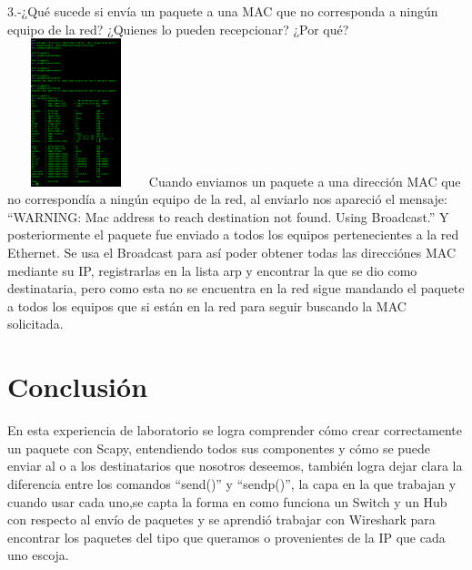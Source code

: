 \documentclass{udpreport}
\begin{document}
  	  3.-¿Qué sucede si envía un paquete a una MAC que no corresponda a ningún equipo
  	      de la red? ¿Quienes lo pueden recepcionar? ¿Por qué?\\
    			\includegraphics[width=4cm, height=4.3cm]{EnvioPaquetitoMalo.png}
 	      Cuando enviamos un paquete a una dirección MAC que no correspondía a ningún equipo de la red, al enviarlo nos apareció
 	      el mensaje: “WARNING: Mac address to reach destination not found. Using Broadcast.” Y posteriormente el paquete fue
 	      enviado a todos los equipos pertenecientes a la red Ethernet. Se usa el Broadcast para así poder obtener todas las
 	      direcciónes MAC mediante su IP, registrarlas en la lista arp y encontrar la que se dio como destinataria, pero como esta
 	      no se encuentra en la red sigue mandando el paquete a todos los equipos que si están en la red para seguir buscando la
 	      MAC solicitada.\\

 	     
	      

\chapter{Conclusión}
  	      En esta experiencia de laboratorio se logra comprender cómo crear correctamente un paquete con Scapy,
  	      entendiendo todos sus componentes y cómo se puede enviar al o a los destinatarios que nosotros deseemos, también
  	      logra dejar clara la diferencia entre los comandos “send()” y “sendp()”, la capa en la que trabajan y cuando usar cada
  	      uno,se capta la forma en como funciona un Switch y un Hub con respecto al envío de paquetes y se aprendió trabajar con
  	      Wireshark para encontrar los paquetes del tipo que queramos o provenientes de la IP que cada uno  escoja.
\begin{thebibliography}{x}

\end{thebibliography}
\end{document}
